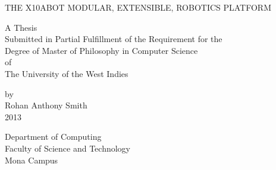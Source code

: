 \documentclass[a4paper, 12pt, oneside]{Thesis}
\begin{document}
\newcommand{\xten}{\texttt{X10ABOT} }
\newcommand{\reg}{\textsuperscript{\textregistered}}
\newcommand{\lego}{LEGO\reg }
\newcommand{\iic}{I$^2$C }


\pagestyle{fancy}
\frontmatter

\begin{titlepage}
\singlespacing
\begin{center}

{\LARGE \uppercase{The X10ABOT Modular, Extensible, Robotics Platform}}


\vfill

\begin{center}
A Thesis\\ 
Submitted in Partial Fulfillment of the Requirement for the \\
Degree of Master of Philosophy in Computer Science\\
\vfill
of\\
The University of the West Indies\\
\end{center}
\vfill
by\\
Rohan Anthony Smith\\
2013\\
\end{center}
Department of Computing\\
Faculty of Science and Technology\\
Mona Campus

\end{titlepage}



\doublespacing
\raggedright




\tableofcontents
\listoffigures
\mainmatter
\end{document}
